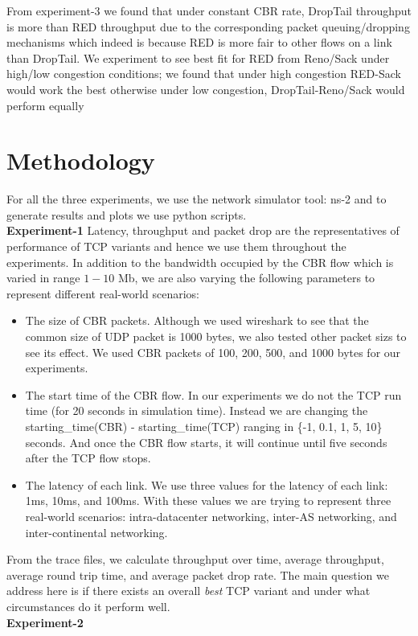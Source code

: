 \documentclass[USenglish,oneside,twocolumn]{article}
\begin{document}
From experiment-3 we found that under constant CBR rate, DropTail throughput is more than RED throughput due to the corresponding packet queuing/dropping mechanisms which indeed is because RED is more fair to other flows on a link than DropTail. We experiment to see best fit for RED from Reno/Sack under high/low congestion conditions; we found that under high congestion RED-Sack would work the best otherwise under low congestion, DropTail-Reno/Sack would perform equally

\section{Methodology}
For all the three experiments, we use the network simulator tool: ns-2 and to generate results and plots we use python scripts.\\
\noindent \textbf{Experiment-1}
Latency, throughput and packet drop are the representatives of performance of TCP variants and hence we use them throughout the experiments. In addition to the bandwidth occupied by the CBR flow which is varied in range \(1-10\) Mb, we are also varying the following parameters to represent different real-world scenarios:
\begin{itemize}
	\item The size of CBR packets. Although we used wireshark to see that the common size of UDP packet is 1000 bytes, we also tested other packet sizs to see its effect. We used CBR packets of 100, 200, 500, and 1000 bytes for our experiments.
	\item The start time of the CBR flow. In our experiments we do not the TCP run time (for 20 seconds in simulation time). Instead we are changing the starting\_time(CBR) - starting\_time(TCP) ranging in \{-1, 0.1, 1, 5, 10\} seconds. And once the CBR flow starts, it will continue until five seconds after the TCP flow stops.
	\item The latency of each link. We use three values for the latency of each link: 1ms, 10ms, and 100ms. With these values we are trying to represent three real-world scenarios: intra-datacenter networking, inter-AS networking, and inter-continental networking.
\end{itemize}
From the trace files, we calculate throughput over time, average throughput, average round trip time, and average packet drop rate. The main question we address here is if there exists an overall \textit{best} TCP variant and under what circumstances do it perform well. \\
\noindent \textbf{Experiment-2}
\end{document}
